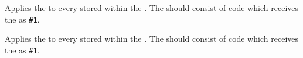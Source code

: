 \documentclass[oneside]{book}
\begin{document}
\begin{function}{\tlMapInline}
\begin{syntax}
  
\end{syntax}
Applies the  to every  stored within the
. The   should consist of code which
receives the  as \verb|#1|.
\begin{demohigh}
\IgnoreSpacesOn
\tlClear \lTmpaTl
{} {
  \tlPutRight \lTmpaTl {[#1]}
}
\tlUse \lTmpaTl
\IgnoreSpacesOff
\end{demohigh}
\end{function}

\begin{function}{\tlVarMapInline}
\begin{syntax}
  
\end{syntax}
Applies the  to every  stored within the
. The  should consist of code which
receives the  as \verb|#1|.
\begin{demohigh}
\IgnoreSpacesOn
\tlClear \lTmpaTl
\tlSet {}
\tlVarMapInline \lTmpkTl {
  \tlPutRight \lTmpaTl {[#1]}
}
\tlUse \lTmpaTl
\IgnoreSpacesOff
\end{demohigh}
\end{function}

\end{document}
